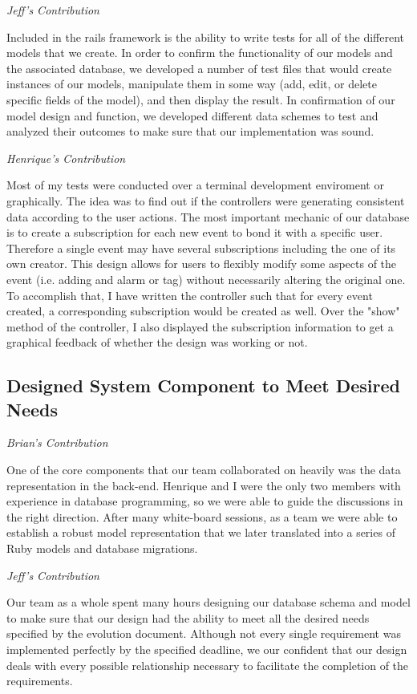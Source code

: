 \documentclass[11pt]{article}
\begin{document}
\textit{Jeff's Contribution}

Included in the rails framework is the ability to write tests for all of the different models that we create.  In order to confirm the functionality of our models and the associated database, we developed a number of test files that would create instances of our models, manipulate them in some way (add, edit, or delete specific fields of the model), and then display the result.  In confirmation of our model design and function, we developed different data schemes to test and analyzed their outcomes to make sure that our implementation was sound.

\textit{Henrique's Contribution}

Most of my tests were conducted over a terminal development enviroment or graphically. The idea was to find out if the controllers were generating consistent data according to the user actions. The most important mechanic of our database is to create a subscription for each new event to bond it with a specific user. Therefore a single event may have several subscriptions including the one of its own creator. This design allows for users to flexibly modify some aspects of the event (i.e. adding and alarm or tag) without necessarily altering the original one. To accomplish that, I have written the controller such that for every event created, a corresponding subscription would be created as well. Over the "show" method of the controller, I also displayed the subscription information to get a graphical feedback of whether the design was working or not. 

\subsection{Designed System Component to Meet Desired Needs}

\textit{Brian's Contribution}

One of the core components that our team collaborated on heavily was the data representation in the back-end. Henrique and I were the only two members with experience in database programming, so we were able to guide the discussions in the right direction. After many white-board sessions, as a team we were able to establish a robust model representation that we later translated into a series of Ruby models and database migrations. 

\textit{Jeff's Contribution}

Our team as a whole spent many hours designing our database schema and model to make sure that our design had the ability to meet all the desired needs specified by the evolution document.  Although not every single requirement was implemented perfectly by the specified deadline, we our confident that our design deals with every possible relationship necessary to facilitate the completion of the requirements.
\end{document}
